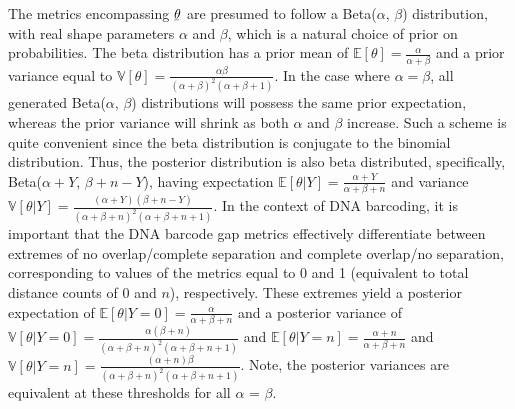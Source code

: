 \documentclass[12pt]{article}
\begin{document}
The metrics encompassing $\underaccent{\bar}{\theta} $ are presumed to follow a Beta($\alpha$, $\beta$) distribution, with real shape parameters $\alpha$ and $\beta$, which is a natural choice of prior on probabilities. The beta distribution has a prior mean of $\mathbb{E}[\theta] = \frac{\alpha}{\alpha + \beta}$ and a prior variance equal to $\mathbb{V}[\theta] = \frac{\alpha\beta}{(\alpha + \beta)^2(\alpha + \beta + 1)}$. In the case where $\alpha = \beta$, all generated Beta($\alpha$, $\beta$) distributions will possess the same prior expectation, whereas the prior variance will shrink as both $\alpha$ and $\beta$ increase. Such a scheme is quite convenient since the beta distribution is conjugate to the binomial distribution. Thus, the posterior distribution is also beta distributed, specifically, Beta($\alpha + Y$, $\beta + n - Y$), having expectation $\mathbb{E}[\theta|Y] = \frac{\alpha + Y}{\alpha + \beta + n}$ and variance $\mathbb{V}[\theta|Y] = \frac{(\alpha + Y)(\beta + n - Y)}{(\alpha + \beta + n)^2(\alpha + \beta + n + 1)}$. In the context of DNA barcoding, it is important that the DNA barcode gap metrics effectively differentiate between extremes of no overlap/complete separation and complete overlap/no separation, corresponding to values of the metrics equal to 0 and 1 (equivalent to total distance counts of 0 and $n$), respectively. These extremes yield a posterior expectation of $\mathbb{E}[\theta|Y = 0] = \frac{\alpha}{\alpha + \beta + n}$ and a posterior variance of $\mathbb{V}[\theta|Y = 0] = \frac{\alpha(\beta + n)}{(\alpha + \beta + n)^2(\alpha + \beta + n + 1)}$ and $\mathbb{E}[\theta|Y = n] = \frac{\alpha + n}{\alpha + \beta + n}$ and $\mathbb{V}[\theta|Y = n] = \frac{(\alpha + n)\beta}{(\alpha + \beta + n)^2(\alpha + \beta + n + 1)}$. Note, the posterior variances are equivalent at these thresholds for all $\alpha$ = $\beta$.
\end{document}
